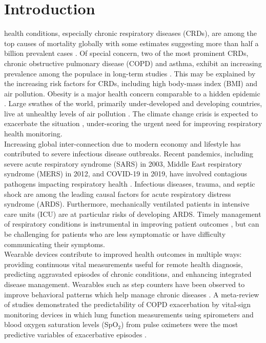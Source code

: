 \documentclass[journal,twoside,web]{ieeecolor}
\begin{document}
\maketitle

\section{Introduction}
\label{sec:introduction}
 health conditions, especially chronic respiratory diseases (CRDs), are among the top causes of mortality globally with some estimates suggesting more than half a billion prevalent cases \cite{viegiGlobalBurdenChronic2020}. Of special concern, two of the most prominent CRDs, chronic obstructive pulmonary disease (COPD) and asthma, exhibit an increasing prevalence among the populace in long-term studies \cite{boersGlobalBurdenChronic2023}. This may be explained by the increasing risk factors for CRDs, including high body-mass index (BMI) and air pollution. Obesity is a major health concern comparable to a hidden epidemic \cite{boutari2022UpdateEpidemiology2022}. Large swathes of the world, primarily under-developed and developing countries, live at unhealthy levels of air pollution \cite{rentschlerGlobalAirPollution2023}. The climate change crisis is expected to exacerbate the situation \cite{andersenClimateChangeRespiratory2023}, under-scoring the urgent need for improving respiratory health monitoring. \\
Increasing global inter-connection due to modern economy and lifestyle has contributed to severe infectious disease outbreaks. Recent pandemics, including severe acute respiratory syndrome (SARS) in 2003, Middle East respiratory syndrome (MERS) in 2012, and COVID-19 in 2019, have involved contagious pathogens impacting respiratory health \cite{bakerInfectiousDiseaseEra2022}. Infectious diseases, trauma, and septic shock are among the leading causal factors for acute respiratory distress syndrome (ARDS). Furthermore, mechanically ventilated patients in intensive care units (ICU) are at particular risks of developing ARDS. Timely management of respiratory conditions is instrumental in improving patient outcomes \cite{leffCOPDClinicalSignificance2005} \cite{arriveEarlyIdentificationDiagnostic2021}, but can be challenging for patients who are less symptomatic or have difficulty communicating their symptoms. \\
Wearable devices contribute to improved health outcomes in multiple ways: providing continuous vital measurements useful for remote health diagnosis, predicting aggravated episodes of chronic conditions, and enhancing integrated disease management. Wearables such as step counters have been observed to improve behavioral patterns which help manage chronic diseases \cite{shahWearableTechnologyInterventions2023}. A meta-review of studies demonstrated the predictability of COPD exacerbation by vital-sign monitoring devices in which lung function measurements using spirometers and blood oxygen saturation levels (SpO$_2$) from pulse oximeters were the most predictive variables of exacerbative episodes \cite{alrajehMonitoringPhysiologicalParameters2016}. \\
\end{document}
